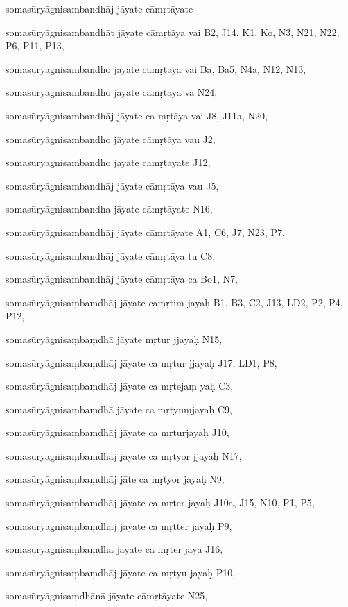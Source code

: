 \begin{marma}[hp02_028]


\item[somasūryāgnisambandhāj jāyate cāmṛtāyate]
\item[somasūryāgnisambandhāt jāyate cāmṛtāya vai] B2, J14, K1, Ko, N3, N21, N22, P6, P11, P13, 
\item[somasūryāgnisambandho jāyate cāmṛtāya vai] Ba, Ba5, N4a, N12, N13, 
\item[somasūryāgnisambandho jāyate cāmṛtāya va] N24,
\item[somasūryāgnisambandhāj jāyate ca mṛtāya vai] J8, J11a, N20,
\item[somasūryāgnisambandho jāyate cāmṛtāya vau] J2,
\item[somasūryāgnisambandho jāyate cāmṛtāyate] J12,
\item[somasūryāgnisambandhāj jāyate cāmṛtāya vau] J5,
\item[somasūryāgnisambandha jāyate cāmṛtāyate] N16,
\item[somasūryāgnisambandhāj jāyate cāmṛtāyate] A1, C6, J7, N23, P7, 
\item[somasūryāgnisambandhāj jāyate cāmṛtāya tu] C8,
\item[somasūryāgnisambandhāj jāyate cāmṛtāya ca] Bo1, N7,
\item[somasūryāgnisaṃbaṃdhāj jāyate camṛtiṃ jayaḥ] B1, B3, C2, J13, LD2, P2, P4, P12, 
\item[somasūryāgnisaṃbaṃdhā jāyate mṛtur jjayaḥ] N15,
\item[somasūryāgnisaṃbaṃdhāj jāyate ca mṛtur jjayaḥ] J17, LD1, P8, 
\item[somasūryāgnisaṃbaṃdhāj jāyate ca mṛtejaṃ yaḥ] C3,
\item[somasūryāgnisaṃbaṃdhā jāyate ca mṛtyuṃjayaḥ] C9,
\item[somasūryāgnisaṃbaṃdhāj jāyate ca mṛturjayaḥ] J10,
\item[somasūryāgnisaṃbaṃdhāj jāyate ca mṛtyor jjayaḥ] N17,
\item[somasūryāgnisaṃbaṃdhāj jāte ca mṛtyor jayaḥ] N9,
\item[somasūryāgnisaṃbaṃdhāj jāyate ca mṛter jayaḥ] J10a, J15, N10, P1, P5,
\item[somasūryāgnisaṃbaṃdhāj jāyate ca mṛtter jayaḥ] P9,
\item[somasūryāgnisaṃbaṃdhā jāyate ca mṛter jayā] J16,
\item[somasūryāgnisaṃbaṃdhāj jāyate ca mṛtyu jayaḥ] P10,
\item[somasūryāgnisaṃdhānā jāyate cāmṛtāyate] N25,

\end{marma}
